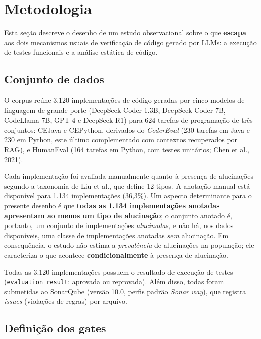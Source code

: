 \section{Metodologia}
\label{sec:metodologia-silenciosas}

Esta seção descreve o desenho de um estudo observacional sobre o que \textbf{escapa} aos dois mecanismos usuais de verificação de código gerado por LLMs: a execução de testes funcionais e a análise estática de código.

\subsection{Conjunto de dados}
\label{sec:conjunto-silenciosas}

O corpus reúne 3.120 implementações de código geradas por cinco modelos de linguagem de grande porte (DeepSeek-Coder-1.3B, DeepSeek-Coder-7B, CodeLlama-7B, GPT-4 e DeepSeek-R1) para 624 tarefas de programação de três conjuntos: CEJava e CEPython, derivados do \textit{CoderEval} (230 tarefas em Java e 230 em Python, este último complementado com contextos recuperados por RAG), e HumanEval (164 tarefas em Python, com testes unitários; Chen et al., 2021).

Cada implementação foi avaliada manualmente quanto à presença de alucinações segundo a taxonomia de Liu et al., que define 12 tipos. A anotação manual está disponível para 1.134 implementações (36,3\%). Um aspecto determinante para o presente desenho é que \textbf{todas as 1.134 implementações anotadas apresentam ao menos um tipo de alucinação}; o conjunto anotado é, portanto, um conjunto de implementações \textit{alucinadas}, e não há, nos dados disponíveis, uma classe de implementações anotadas \textit{sem} alucinação. Em consequência, o estudo não estima a \textit{prevalência} de alucinações na população; ele caracteriza o que acontece \textbf{condicionalmente} à presença de alucinação.

Todas as 3.120 implementações possuem o resultado de execução de testes (\texttt{evaluation result}: aprovada ou reprovada). Além disso, todas foram submetidas ao SonarQube (versão 10.0, perfis padrão \textit{Sonar way}), que registra \textit{issues} (violações de regras) por arquivo.

\subsection{Definição dos gates}
\label{sec:gates}

